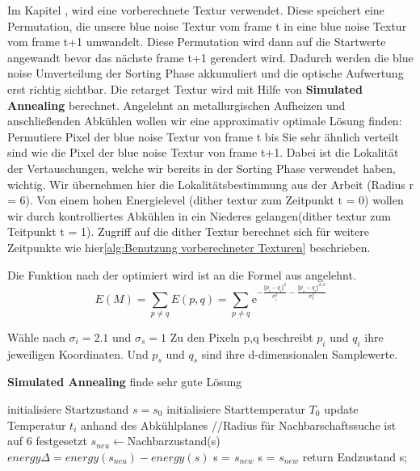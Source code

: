 Im Kapitel ,
wird eine vorberechnete Textur verwendet. Diese speichert eine
Permutation, die unsere blue noise Textur vom frame t in eine
blue noise Textur vom frame t+1 umwandelt. Diese Permutation wird 
dann auf die Startwerte angewandt bevor das nächste frame t+1 gerendert wird.
Dadurch werden die blue noise Umverteilung der Sorting Phase 
akkumuliert und die optische Aufwertung erst richtig sichtbar.
Die retarget Textur wird mit Hilfe von \textbf{Simulated Annealing} 
\cite{hal02158423} berechnet. Angelehnt an metallurgischen Aufheizen und anschließenden Abkühlen wollen wir eine approximativ 
optimale Lösung finden: Permutiere Pixel der blue noise Textur von 
frame t bis Sie sehr ähnlich verteilt sind wie die Pixel der blue noise
Textur von frame t+1. Dabei ist die Lokalität der Vertauschungen, 
welche wir bereits in der Sorting Phase
verwendet haben, wichtig. Wir übernehmen hier die Lokalitätsbestimmung aus 
der Arbeit \cite{hal02158423}(Radius r = 6). Von einem hohen Energielevel 
(dither textur zum Zeitpunkt t = 0) wollen wir durch kontrolliertes 
Abkühlen in ein Niederes gelangen(dither textur zum Teitpunkt t = 1).
Zugriff auf die dither Textur berechnet sich für weitere Zeitpunkte
wie hier\ref{alg:Benutzung vorberechneter Texturen} beschrieben.

Die Funktion nach der optimiert wird ist an die Formel aus\cite{georgiev2016blue} angelehnt.
\begin{equation}\label{eq:pixel energy function}
    E(M) = \sum_{p \neq q}E(p,q) = 
           \sum_{p \neq q} \mathrm{e}^{-\frac{\Vert{p_{i}-q_{i}}\Vert^{2}}{\sigma_{i}^{2}} -
           \frac{\Vert{p_{s}-q_{s}}\Vert^{d/2}}{\sigma_{s}^{2}}}
\end{equation}

Wähle nach \cite{ulichney1993void} $\sigma_{i} = 2.1$ und $\sigma_{s} = 1$ 
Zu den Pixeln p,q beschreibt $p_{i}$ und $q_{i}$ ihre jeweiligen Koordinaten.
Und $p_{s}$ und $q_{s}$ sind ihre d-dimensionalen Samplewerte.


\begin{algorithm}[H]
    \caption{\textbf{Simulated Annealing} finde sehr gute Lösung}
    \begin{algorithmic}[1]
        \State initialisiere Startzustand $s=s_{0}$
        \State initialisiere Starttemperatur $T_0$
        \State update Temperatur $t_i$ anhand des Abkühlplanes
        \State //Radius für Nachbarschaftssuche ist auf 6 festgesetzt
        \State $s_{neu}\leftarrow$Nachbarzustand(s)
        \State $energy\Delta = energy(s_{neu}) - energy(s)$
        \State s = $s_{new}$
        \Else{}
        \State s = $s_{new}$
        \EndIf
        \EndIf
        \EndFor
        \State return Endzustand s;
    \end{algorithmic}
    \label{alg:retargeting}
\end{algorithm}

